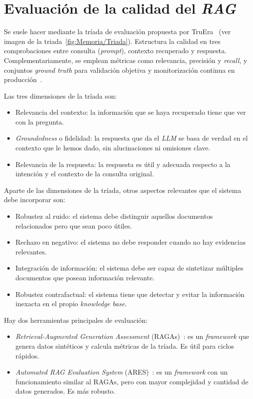 \section{Evaluación de la calidad del \textit{RAG}}
Se suele hacer mediante la tríada de evaluación propuesta por TruEra~\cite{RAG:triad} (ver imagen de la triada~\ref{fig:Memoria/Triada}). Estructura la calidad en tres comprobaciones entre consulta (\textit{prompt}), contexto recuperado y respuesta. Complementariamente, se emplean métricas como relevancia, precisión y \textit{recall}, y conjuntos \textit{ground truth} para validación objetiva y monitorización continua en producción~\cite{book:RAG_SimpleGuide}.


Las tres dimensiones de la tríada son:
\begin{itemize}
\tightlist
	\item Relevancia del contexto: la información que se haya recuperado tiene que ver con la pregunta.
	\item \textit{Groundedness} o fidelidad: la respuesta que da el \textit{LLM} se basa de verdad en el contexto que le hemos dado, sin alucinaciones ni omisiones clave.
	\item Relevancia de la respuesta: la respuesta es útil y adecuada respecto a la intención y el contexto de la consulta original.
\end{itemize}

Aparte de las dimensiones de la tríada, otros aspectos relevantes que el sistema debe incorporar son:
\begin{itemize}
\tightlist
	\item Robustez al ruido: el sistema debe distinguir aquellos documentos relacionados pero que sean poco útiles.
	\item Rechazo en negativo: el sistema no debe responder cuando no hay evidencias relevantes.
	\item Integración de información: el sistema debe ser capaz de sintetizar múltiples documentos que posean información relevante.
	\item Robustez contrafactual: el sistema tiene que detectar y evitar la información inexacta en el propio \textit{knowledge base}.
\end{itemize}

Hay dos herramientas principales de evaluación:
\begin{itemize}
\tightlist
	\item \textit{Retrieval-Augmented Generation Assessment} (RAGAs)~\cite{ragas:docs}: es un \textit{framework} que genera datos sintéticos y calcula métricas de la tríada. Es útil para ciclos rápidos. 
	\item \textit{Automated RAG Evaluation System} (ARES)~\cite{saadfalcon2023ares}: es un \textit{framework} con un funcionamiento similar al RAGAs, pero con mayor complejidad y cantidad de datos generados. Es más robusto.
\end{itemize}
